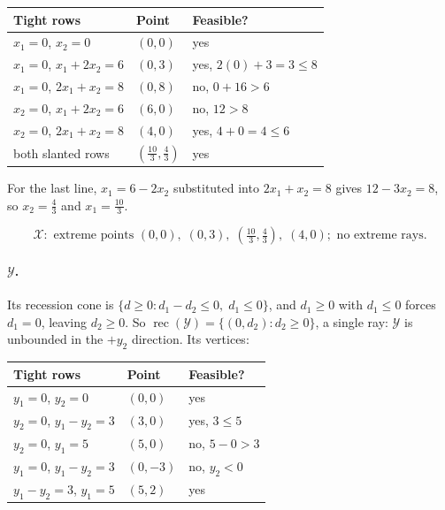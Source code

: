 \documentclass[11pt]{article}
\DeclareMathOperator{\rec}{rec}
\theoremstyle{definition}
\theoremstyle{plain}
\begin{document}
\begin{center}
\begin{tabular}{@{}lll@{}}
\toprule
Tight rows & Point & Feasible? \\
\midrule
$x_1 = 0$, $x_2 = 0$ & $(0,0)$ & yes \\
$x_1 = 0$, $x_1 + 2x_2 = 6$ & $(0,3)$ & yes, $2(0)+3 = 3 \le 8$ \\
$x_1 = 0$, $2x_1 + x_2 = 8$ & $(0,8)$ & no, $0 + 16 > 6$ \\
$x_2 = 0$, $x_1 + 2x_2 = 6$ & $(6,0)$ & no, $12 > 8$ \\
$x_2 = 0$, $2x_1 + x_2 = 8$ & $(4,0)$ & yes, $4 + 0 = 4 \le 6$ \\
both slanted rows & $(\tfrac{10}{3}, \tfrac43)$ & yes \\
\bottomrule
\end{tabular}
\end{center}

For the last line, $x_1 = 6 - 2x_2$ substituted into
$2x_1 + x_2 = 8$ gives $12 - 3x_2 = 8$, so $x_2 = \tfrac43$ and
$x_1 = \tfrac{10}{3}$.

\[
  \boxed{\;
  \mathcal{X}: \text{ extreme points }
    (0,0),\;(0,3),\;(\tfrac{10}{3},\tfrac43),\;(4,0);
    \text{ no extreme rays.} \;}
\]

\paragraph{$\mathcal{Y}$.} Its recession cone is
$\{d \ge 0 : d_1 - d_2 \le 0,\; d_1 \le 0\}$, and $d_1 \ge 0$ with
$d_1 \le 0$ forces $d_1 = 0$, leaving $d_2 \ge 0$. So
$\rec(\mathcal{Y}) = \{(0,d_2) : d_2 \ge 0\}$, a single ray:
$\mathcal{Y}$ is unbounded in the $+y_2$ direction. Its vertices:

\begin{center}
\begin{tabular}{@{}lll@{}}
\toprule
Tight rows & Point & Feasible? \\
\midrule
$y_1 = 0$, $y_2 = 0$ & $(0,0)$ & yes \\
$y_2 = 0$, $y_1 - y_2 = 3$ & $(3,0)$ & yes, $3 \le 5$ \\
$y_2 = 0$, $y_1 = 5$ & $(5,0)$ & no, $5 - 0 > 3$ \\
$y_1 = 0$, $y_1 - y_2 = 3$ & $(0,-3)$ & no, $y_2 < 0$ \\
$y_1 - y_2 = 3$, $y_1 = 5$ & $(5,2)$ & yes \\
\bottomrule
\end{tabular}
\end{center}
\end{document}
